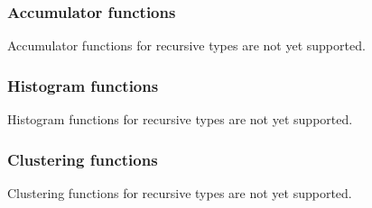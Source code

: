 \noindent

\subsubsection{Accumulator functions}
Accumulator functions for recursive types are not yet supported. 

\subsubsection{Histogram functions}
Histogram functions for recursive types are not yet supported.


\subsubsection{Clustering functions}
Clustering functions for recursive types are not yet supported.
